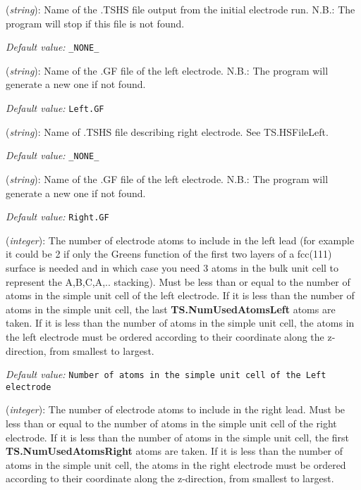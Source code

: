 \documentclass[11pt]{article}
\begin{document}
\begin{description}
\itemsep 10pt
\parsep 0pt

\item[{\bf TS.HSFileLeft }] ({\it string}): 
Name of the .TSHS file output from the initial electrode run. 
N.B.: The program will stop if this file is not found.

{\it Default value:} {\tt \_NONE\_} 

\item[{\bf TS.GFFileLeft }] ({\it string}): 
Name of the .GF file of the left electrode. 
N.B.: The program will generate a new one if not found.

{\it Default value:} {\tt Left.GF} 

\item[{\bf TS.HSFileRight }] ({\it string}): 
Name of .TSHS file describing right electrode. See TS.HSFileLeft. 

{\it Default value:} {\tt \_NONE\_} 

\item[{\bf TS.GFFileRight }] ({\it string}): 
Name of the .GF file of the left electrode. 
N.B.: The program will generate a new one if not found.

{\it Default value:} {\tt Right.GF}

\item[{\bf TS.NumUsedAtomsLeft}] ({\it integer}):
   The number of
  electrode atoms to include in the left lead (for example it could be
  2 if only the Greens function of the first two layers of a fcc(111)
  surface is needed and in which case you need 3 atoms in the bulk
  unit cell to represent the A,B,C,A,.. stacking). Must be less than
  or equal to the number of atoms in the simple unit cell of the left
  electrode.  If it is less than the number of atoms in the simple
  unit cell, the last {\bf TS.NumUsedAtomsLeft} atoms are taken. If it
  is less than the number of atoms in the simple unit cell, the atoms
  in the left electrode must be ordered according to their coordinate
  along the z-direction, from smallest to largest.

{\it Default value:} {\tt Number of atoms in the simple unit cell of
  the Left electrode}

\item[{\bf TS.NumUsedAtomsRight}] ({\it integer}):
   The number
  of electrode atoms to include in the right lead. Must be less than
  or equal to the number of atoms in the simple unit cell of the right
  electrode. If it is less than the number of atoms in the simple unit
  cell, the first {\bf TS.NumUsedAtomsRight} atoms are taken. If it is
  less than the number of atoms in the simple unit cell, the atoms in
  the right electrode must be ordered according to their coordinate
  along the z-direction, from smallest to largest.


\end{description}
\end{document}
